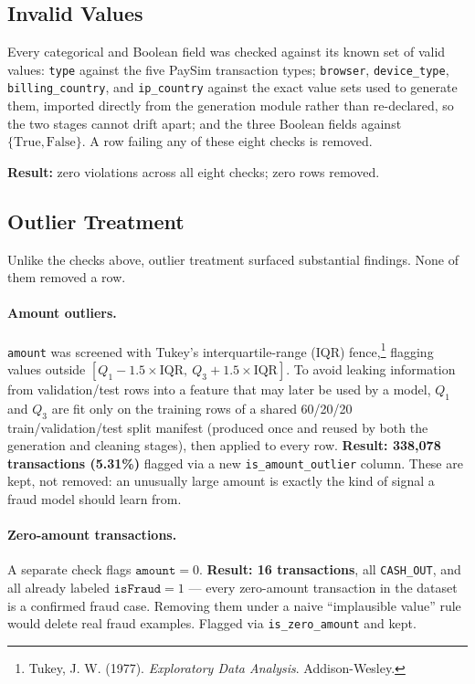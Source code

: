 \subsection{Invalid Values}
\label{subsec:invalid-values}

Every categorical and Boolean field was checked against its known set of valid values: \texttt{type} against the five PaySim transaction types; \texttt{browser}, \texttt{device\_type}, \texttt{billing\_country}, and \texttt{ip\_country} against the exact value sets used to generate them, imported directly from the generation module rather than re-declared, so the two stages cannot drift apart; and the three Boolean fields against \(\{\mathrm{True}, \mathrm{False}\}\). A row failing any of these eight checks is removed.

\textbf{Result:} zero violations across all eight checks; zero rows removed.

\subsection{Outlier Treatment}
\label{subsec:outlier-treatment}

Unlike the checks above, outlier treatment surfaced substantial findings. None of them removed a row.

\paragraph{Amount outliers.} \texttt{amount} was screened with Tukey's interquartile-range (IQR) fence,\footnote{Tukey, J. W. (1977). \emph{Exploratory Data Analysis}. Addison-Wesley.} flagging values outside \([Q_1 - 1.5 \times \mathrm{IQR},\ Q_3 + 1.5 \times \mathrm{IQR}]\). To avoid leaking information from validation/test rows into a feature that may later be used by a model, \(Q_1\) and \(Q_3\) are fit only on the training rows of a shared 60/20/20 train/validation/test split manifest (produced once and reused by both the generation and cleaning stages), then applied to every row. \textbf{Result: 338,078 transactions (5.31\%)} flagged via a new \texttt{is\_amount\_outlier} column. These are kept, not removed: an unusually large amount is exactly the kind of signal a fraud model should learn from.

\paragraph{Zero-amount transactions.} A separate check flags \(\texttt{amount} = 0\). \textbf{Result: 16 transactions}, all \texttt{CASH\_OUT}, and all already labeled \(\texttt{isFraud}=1\) --- every zero-amount transaction in the dataset is a confirmed fraud case. Removing them under a naive ``implausible value'' rule would delete real fraud examples. Flagged via \texttt{is\_zero\_amount} and kept.

